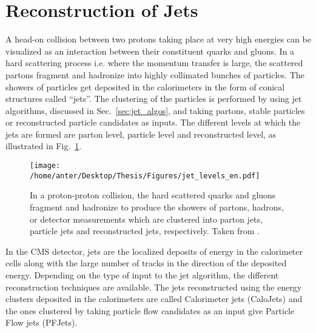\section{Reconstruction of Jets} 
A head-on collision between two protons taking place at very high energies can be visualized as an interaction between their constituent quarks and gluons. In a hard scattering process i.e. where the momentum transfer is large, the scattered partons fragment and hadronize into highly collimated bunches of particles. The showers of particles get deposited in the calorimeters in the form of conical structures called ``jets''. The clustering of the particles is performed by using jet algorithms, discussed in Sec.~\ref{sec:jet_algos}, and taking partons, stable particles or reconstructed particle candidates as inputs. The different levels at which the jets are formed are parton level, particle level and reconstructed level, as illustrated in Fig.~\ref{fig:jets}. %
\begin{figure}[!h]
\begin{center}
\vspace*{3mm} 
\hspace*{-5mm}
\texttt{[image: /home/anter/Desktop/Thesis/Figures/jet\_levels\_en.pdf]}\\
\vspace*{4mm}
\caption{In a proton-proton collision, the hard scattered quarks and gluons fragment and hadronize to produce the showers of partons, hadrons, or detector measurements which are clustered into parton jets, particle jets and reconstructed jets, respectively. Taken from \cite{Schorner-Sadenius:2015cga}.}
\label{fig:jets}
\end{center}
\end{figure}
In the CMS detector, jets are the localized deposits of energy in the calorimeter cells along with the large number of tracks in the direction of the deposited energy. Depending on the type of input to the jet algorithm, the different reconstruction techniques are available. The jets reconstructed using the energy clusters deposited in the calorimeters are called Calorimeter jets (CaloJets) and the ones clustered by taking particle flow candidates as an input give Particle Flow jets (PFJets). 

